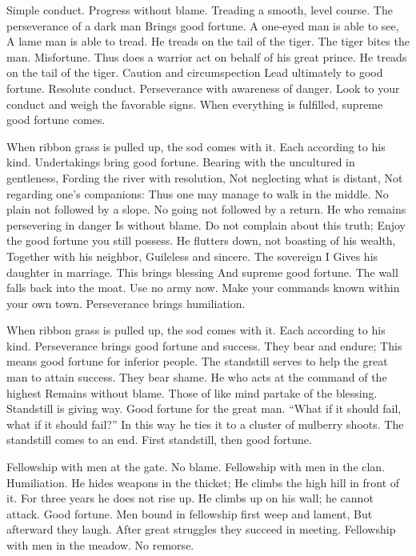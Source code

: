 {Simple conduct. Progress without blame.}
{Treading a smooth, level course.
 The perseverance of a dark man
 Brings good fortune.}
{A one-eyed man is able to see,
 A lame man is able to tread.
 He treads on the tail of the tiger.
 The tiger bites the man.
 Misfortune.
 Thus does a warrior act on behalf of his great prince.}
{He treads on the tail of the tiger.
 Caution and circumspection
 Lead ultimately to good fortune.}
{Resolute conduct.
 Perseverance with awareness of danger.}
{Look to your conduct and weigh the favorable signs.
 When everything is fulfilled, supreme good fortune comes.}

{When ribbon grass is pulled up, the sod comes with it.
 Each according to his kind.
 Undertakings bring good fortune.}
{Bearing with the uncultured in gentleness,
 Fording the river with resolution,
 Not neglecting what is distant,
 Not regarding one’s companions:
 Thus one may manage to walk in the middle.}
{No plain not followed by a slope.
 No going not followed by a return.
 He who remains persevering in danger
 Is without blame.
 Do not complain about this truth;
 Enjoy the good fortune you still possess.}
{He flutters down, not boasting of his wealth,
 Together with his neighbor,
 Guileless and sincere.}
{The sovereign I
 Gives his daughter in marriage.
 This brings blessing
 And supreme good fortune.}
{The wall falls back into the moat.
 Use no army now.
 Make your commands known within your own town.
 Perseverance brings humiliation.}

{When ribbon grass is pulled up, the sod comes with it.
 Each according to his kind.
 Perseverance brings good fortune and success.}
{They bear and endure;
 This means good fortune for inferior people.
 The standstill serves to help the great man to attain success.}
{They bear shame.}
{He who acts at the command of the highest
 Remains without blame.
 Those of like mind partake of the blessing.}
{Standstill is giving way.
 Good fortune for the great man.
 “What if it should fail, what if it should fail?”
 In this way he ties it to a cluster of mulberry shoots.}
{The standstill comes to an end.
 First standstill, then good fortune.}

{Fellowship with men at the gate.
 No blame.}
{Fellowship with men in the clan.
 Humiliation.}
{He hides weapons in the thicket;
 He climbs the high hill in front of it.
 For three years he does not rise up.}
{He climbs up on his wall; he cannot attack.
 Good fortune.}
{Men bound in fellowship first weep and lament,
 But afterward they laugh.
 After great struggles they succeed in meeting.}
{Fellowship with men in the meadow.
 No remorse.}

